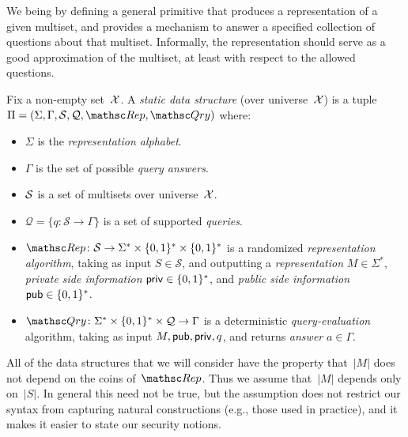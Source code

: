   We being by defining a general primitive
that produces a representation of a given multiset, and provides a
mechanism to answer a specified collection of questions about that
multiset.  Informally, the representation should serve as a good
approximation of the multiset, at least with respect to the allowed
questions.
\begin{definition} \rm
Fix a non-empty set~${\cal X}$. A \emph{static data structure} (over universe~${\cal X}$)
is a tuple $\setprim=(\Sigma,\Gamma,\calS,\calQ,\Rep, \Qry)$ where:
\begin{itemize}
\item $\Sigma$ is the \emph{representation alphabet}. 
\item $\Gamma$ is the set of possible \emph{query answers}.
\item ${\cal S}$ is a set  of multisets over universe~${\cal X}$.
\item $\mathcal{Q}=\{q \colon \mathcal{S} \to \Gamma\}$ is a set
    of supported \emph{queries}.
\item $\Rep \colon \mathcal{S} \to \Sigma^* \times \bits^*
    \times \bits^*$ is a randomized \emph{representation
    algorithm}, taking as input $S \in \mathcal{S}$, and
    outputting a \emph{representation} $M \in \Sigma^*$,
    \emph{private side information} ${\sf priv} \in \{0,1\}^*$, and
    \emph{public side information} ${\sf pub} \in \{0,1\}^*$.
\item $\Qry\colon \Sigma^* \times \bits^* \times \calQ \to
    \Gamma$ is a deterministic \emph{query-evaluation}
    algorithm, taking as input $M, {\sf pub},{\sf priv}, q$, and returns
    \emph{answer} $a \in \Gamma$. 
\end{itemize}
\hfill\dqed
\end{definition}
All of the data structures that
we will consider have the property that~$|M|$ does not depend on the
coins of~$\Rep$. Thus we assume that~$|M|$ depends only on~$|S|$. In
general this need not be true, but the assumption does not restrict
our syntax from capturing natural constructions (e.g., those used in
practice), and it makes it easier to state our security notions.

